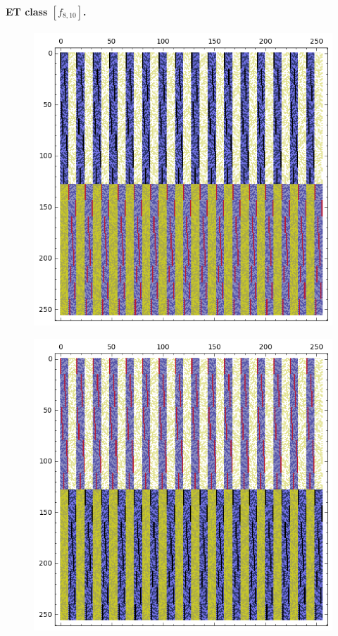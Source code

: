 \documentclass[12pt,a4paper]{article}
\begin{document}
\paragraph*{ET class $[f_{8,10}]$.}
\begin{figure}[!hb]
\centering
\begin{minipage}{.48\textwidth}
  \centering
  \includegraphics[width=.9\linewidth]{../matrix_plot/re8_10_bent_cayley_graph_index_matrix.png}
  \label{fig:c8_10_bent_cayley_graph_index_matrix}
\end{minipage}
\begin{minipage}{.48\textwidth}
  \centering
  \includegraphics[width=.9\linewidth]{../matrix_plot/re8_10_dual_cayley_graph_index_matrix.png}
  \label{fig:c8_10_dual_cayley_graph_index_matrix}
\end{minipage}%
\end{figure}
\end{document}
